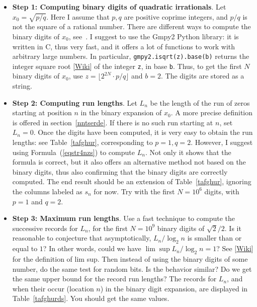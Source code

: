 \documentclass[oneside,10pt]{book}
\begin{document}
\begin{itemize}
\item[] {\bf Step 1:  Computing binary digits of quadratic irrationals}. Let $x_0 = \sqrt{p/q}$. Here I assume that $p,q$ are positive coprime integers, and $p/q$ is not the square of
 a rational number. There are different ways to compute the binary digits of $x_0$, see~\cite{vgchaos}. I suggest to use the 
 \textcolor{index}{Gmpy2} Python library: it is written in C, thus very fast, and it offers a lot of functions to
 work with arbitrary large numbers. In particular, \texttt{gmpy2.isqrt(z).base(b)} returns the 
\textcolor{index}{integer square root} [\href{https://en.wikipedia.org/wiki/Integer_square_root}{Wiki}] of the integer \texttt{z}, in base \texttt{b}. 
Thus, to get the first $N$ binary digits of $x_0$,
 use $z = \lfloor 2^{2N} \cdot p/q \rfloor$ and $b=2$. The digits are stored as a string. \vspace{1ex}
\item[] {\bf Step 2: Computing run lengths}. Let $L_n$ be the length of the run of zeros starting at position $n$ in the binary expansion 
 of $x_0$. A more precise definition is offered in section~\ref{nntserde}. If there is no such run starting at $n$, set $L_n=0$.
Once the digits have been computed, it is very easy to obtain the run lengths: see Table~\ref{tafghur}, corresponding to $p=1, q=2$.
However, I suggest using Formula~(\ref{eqstr4nzs}) to compute $L_n$. Not only it shows that the formula is correct, but it also offers an
 alternative method not based on the binary digits, thus also confirming that the binary digits are correctly computed. The end result should
 be an extension of Table~\ref{tafghur}, ignoring the columns labeled as $s_n$ for now. Try with the first $N=10^6$ digits,
with $p=1$ and $q=2$.  

\vspace{1ex}
\item[]{\bf Step 3: Maximum run lengths}. Use a fast technique to compute the successive 
\textcolor{index}{records} for $L_n$, for the first $N=10^9$ binary digits
 of $\sqrt{2}/2$. Is it reasonable to conjecture that asymptotically, $L_n/\log_2 n$ is smaller than or  equal to $1$? In other words, could
  we have $\lim\sup L_n/\log_2 n = 1$? See [\href{https://en.wikipedia.org/wiki/Limit_inferior_and_limit_superior}{Wiki}] for the definition 
of \textcolor{index}{lim sup}. Then instead of using the binary digits of some number, do the same test for random bits. Is the  behavior similar? Do we get the same upper bound for the record run lengths? The records for $L_n$, and when their occur (location $n$) in the
 binary digit expansion, are displayed in Table~\ref{tafghurds}. You should get the same values.
\end{itemize}
\vspace{1ex}
\end{document}
